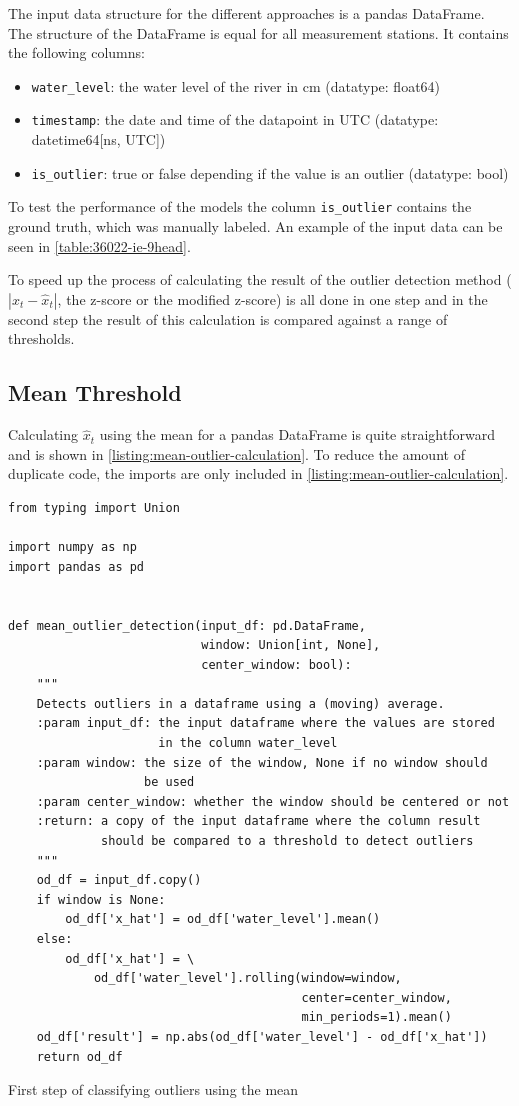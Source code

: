 The input data structure for the different approaches is a pandas DataFrame. The structure of the DataFrame is equal for all measurement stations. It contains the following columns:
\begin{itemize}
    \item \verb|water_level|: the water level of the river in cm (datatype: float64)
    \item \verb|timestamp|: the date and time of the datapoint in UTC (datatype: datetime64[ns, UTC])
    \item \verb|is_outlier|: true or false depending if the value is an outlier (datatype: bool)
\end{itemize}
To test the performance of the models the column \verb|is_outlier| contains the ground truth, which was manually labeled. An example of the input data can be seen in \autoref{table:36022-ie-9head}.


To speed up the process of calculating the result of the outlier detection method ($|x_t - \hat{x}_t|$, the z-score or the modified z-score) is all done in one step and in the second step the result of this calculation is compared against a range of thresholds.
\subsection{Mean Threshold}
Calculating $\hat{x}_t$ using the mean for a pandas DataFrame is quite straightforward and is shown in \autoref{listing:mean-outlier-calculation}. To reduce the amount of duplicate code, the imports are only included in \autoref{listing:mean-outlier-calculation}.
\begin{listing}
\begin{verbatim}
from typing import Union

import numpy as np
import pandas as pd


def mean_outlier_detection(input_df: pd.DataFrame,
                           window: Union[int, None],
                           center_window: bool):
    """
    Detects outliers in a dataframe using a (moving) average.
    :param input_df: the input dataframe where the values are stored
                     in the column water_level
    :param window: the size of the window, None if no window should
                   be used
    :param center_window: whether the window should be centered or not
    :return: a copy of the input dataframe where the column result
             should be compared to a threshold to detect outliers
    """
    od_df = input_df.copy()
    if window is None:
        od_df['x_hat'] = od_df['water_level'].mean()
    else:
        od_df['x_hat'] = \
            od_df['water_level'].rolling(window=window,
                                         center=center_window,
                                         min_periods=1).mean()
    od_df['result'] = np.abs(od_df['water_level'] - od_df['x_hat'])
    return od_df
\end{verbatim}
\caption{First step of classifying outliers using the mean}
\label{listing:mean-outlier-calculation}
\end{listing}


